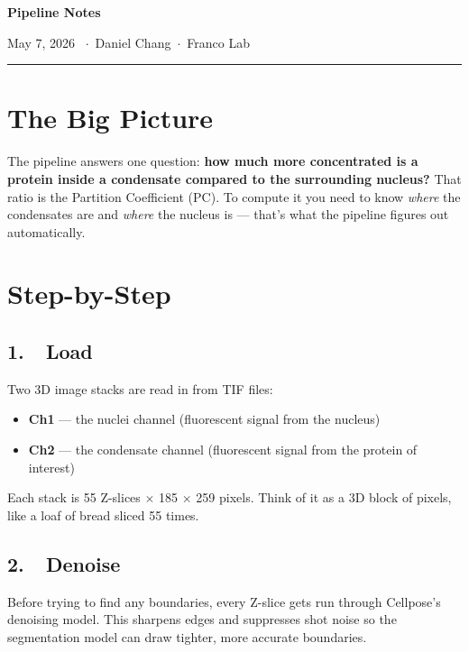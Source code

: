 \documentclass[11pt]{article}
\begin{document}
{\LARGE\bfseries\color{accent} Pipeline Notes}\par
{\large\color{lightgray} May 7, 2026 \ $\cdot$\ Daniel Chang\ $\cdot$\ Franco Lab}
\vspace{4pt}
\color{rulegray}\rule{\linewidth}{1.2pt}\color{black}
\vspace{8pt}

\section*{The Big Picture}

The pipeline answers one question: \textbf{how much more concentrated is a protein inside a condensate compared to the surrounding nucleus?} That ratio is the Partition Coefficient (PC). To compute it you need to know \textit{where} the condensates are and \textit{where} the nucleus is --- that's what the pipeline figures out automatically.

\section*{Step-by-Step}

\subsection*{1.\ \ Load}
Two 3D image stacks are read in from TIF files:
\begin{itemize}
  \item \textbf{Ch1} --- the nuclei channel (fluorescent signal from the nucleus)
  \item \textbf{Ch2} --- the condensate channel (fluorescent signal from the protein of interest)
\end{itemize}
Each stack is 55 Z-slices $\times$ 185 $\times$ 259 pixels. Think of it as a 3D block of pixels, like a loaf of bread sliced 55 times.

\subsection*{2.\ \ Denoise}
Before trying to find any boundaries, every Z-slice gets run through Cellpose's denoising model. This sharpens edges and suppresses shot noise so the segmentation model can draw tighter, more accurate boundaries.
\end{document}
